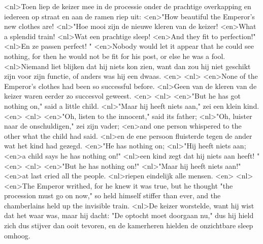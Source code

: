 <nl>Toen liep de keizer mee in de processie onder de prachtige overkapping en iedereen op straat en aan de ramen riep uit:
<en>"How beautiful the Emperor's new clothes are!
<nl>"Hoe mooi zijn de nieuwe kleren van de keizer!
<en>What a splendid train!
<nl>Wat een prachtige sleep!
<en>And they fit to perfection!"
<nl>En ze passen perfect! "
<en>Nobody would let it appear that he could see nothing, for then he would not be fit for his post, or else he was a fool.
<nl>Niemand liet blijken dat hij niets kon zien, want dan zou hij niet geschikt zijn voor zijn functie, of anders was hij een dwaas.
<en>
<nl>
<en>None of the Emperor's clothes had been so successful before.
<nl>Geen van de kleren van de keizer waren eerder zo succesvol geweest.
<en>
<nl>
<en>"But he has got nothing on," said a little child.
<nl>"Maar hij heeft niets aan," zei een klein kind.
<en>
<nl>
<en>"Oh, listen to the innocent," said its father;
<nl>"Oh, luister naar de onschuldigen," zei zijn vader;
<en>and one person whispered to the other what the child had said.
<nl>en de ene persoon fluisterde tegen de ander wat het kind had gezegd.
<en>"He has nothing on;
<nl>"Hij heeft niets aan;
<en>a child says he has nothing on!"
<nl>een kind zegt dat hij niets aan heeft! "
<en>
<nl>
<en>"But he has nothing on!"
<nl>"Maar hij heeft niets aan!"
<en>at last cried all the people.
<nl>riepen eindelijk alle mensen.
<en>
<nl>
<en>The Emperor writhed, for he knew it was true, but he thought "the procession must go on now," so held himself stiffer than ever, and the chamberlains held up the invisible train.
<nl>De keizer worstelde, want hij wist dat het waar was, maar hij dacht: "De optocht moet doorgaan nu," dus hij hield zich dus stijver dan ooit tevoren, en de kamerheren hielden de onzichtbare sleep omhoog.
